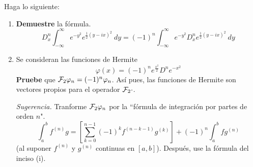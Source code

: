 \documentclass[12pt]{report}
\theoremstyle{largebreak}
\newcommand{\fou}[1]{\ensuremath{\mathcal{F}#1}}
\begin{document}
    \begin{excer}
        Haga lo siguiente:
        \begin{enumerate}
            \item \textbf{Demuestre} la fórmula.
            \begin{equation*}
                D_x^n\int_{-\infty}^\infty e^{ -y^2}e^{\frac{1}{2}(y-ix)^2}\:dy=(-1)^n\int_{-\infty}^\infty e^{ -y^2}D_x^n e^{\frac{1}{2}(y-ix)^2}\:dy
            \end{equation*}
            \item Se consideran las funciones de Hermite
            \begin{equation*}
                \varphi(x)=(-1)^n e^{\frac{x^2}{2}}D^n e^{ -x^2}
            \end{equation*}
            \textbf{Pruebe} que $\fou_2{\varphi_n}=(-1)^n\varphi_n$. Así pues, las funciones de Hermite son vectores propios para el operador $\fou_2{\cdot}$.

            \textit{Sugerencia.} Tranforme $\fou_2{\varphi_n}$ por la ``fórmula de integración por partes de orden $n$".
            \begin{equation*}
                \int_a^b f^(n)g=\left[\sum_{ k=0}^{ n-1}(-1)^kf^{ (n-k-1)}g^{(k)} \right]+(-1)^n\int_a^b fg^(n)
            \end{equation*}
            (al suponer $f^(n)$ y $g^(n)$ continuas en $[a,b]$). Después, use la fórmula del inciso (i).
        \end{enumerate}
    \end{excer}

    \begin{sol}
        
    \end{sol}
\end{document}
